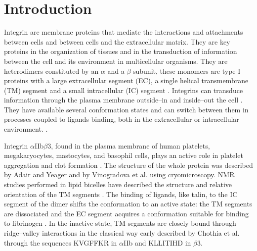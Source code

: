 \documentclass[journal=jacsat,manuscript=article]{achemso}
\begin{document}
\section{Introduction}
    Integrin are membrane proteins that mediate the interactions and attachments between cells and between cells and the extracellular matrix. They are key proteins in the organization of tissues and in the transduction of information between the cell and its environment in multicellular organisms. They are heterodimers constituted by an $\alpha$ and a $\beta$ subunit, these monomers are type I proteins with a large extracellular segment (EC), a single helical transmembrane (TM) segment and a small intracellular (IC) segment \cite{Tamkun1986,2010_Barczyk}. Integrins can transduce information through the plasma membrane outside–in and inside–out the cell \cite{Iwamoto2015, Campbell2011}. They have available several conformation states and can switch between them in processes coupled to ligands binding, both in the extracellular or intracellular environment. \cite{Luo2003,Li2017,Litvinov2004,Springer2012}.

    Integrin $\alpha$IIb$\beta$3, found in the plasma membrane of human platelets, megakaryocytes, mastocytes, and basophil cells, plays an active role in platelet aggregation and clot formation \cite{Chen1997,Pabla1999,Kaneva2019}. The structure of the whole protein was described by Adair and Yeager \cite{Adair2002} and by Vinogradova et al. \cite{Vinogradova2002} using cryomicroscopy. NMR studies performed in lipid bicelles have described the structure and relative orientation of the TM segments \cite{Lau2009,Yang2009,Ulmer2010}. The binding of ligands, like talin, to the IC segment of the dimer shifts the conformation to an active state: the TM segments are dissociated and the EC segment acquires a conformation suitable for binding to fibrinogen \cite{Ugarova2001,Mosesson2005}. In the inactive state, TM segments are closely bound through ridge–valley interactions \cite{Zhu2009} in the classical way early described by Chothia et al. \cite{1977_Chothia} through the sequences KVGFFKR in $\alpha$IIb and KLLITIHD in $\beta$3.
\end{document}

